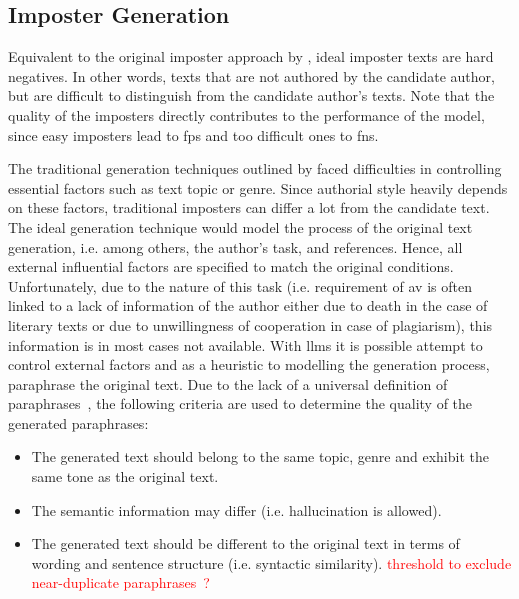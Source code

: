 \subsection{Imposter Generation}
\label{subsec:imposter_generation}

Equivalent to the original imposter approach by \citet{koppel_determining_2014}, ideal imposter texts are hard negatives.
In other words, texts that are not authored by the candidate author, but are difficult to distinguish from the candidate author's texts.
Note that the quality of the imposters directly contributes to the performance of the model, 
since easy imposters lead to \acp{fp} and too difficult ones to \acp{fn}.

The traditional generation techniques outlined by \citet{koppel_determining_2014} faced difficulties in controlling essential factors such as text topic or genre.
Since authorial style heavily depends on these factors, traditional imposters can differ a lot from the candidate text.
The ideal generation technique would model the process of the original text generation, 
i.e. among others, the author's task, and references.
Hence, all external influential factors are specified to match the original conditions.
Unfortunately, due to the nature of this task 
(i.e. requirement of \ac{av} is often linked to a lack of information of the author either due to death in the case of literary texts or 
due to unwillingness of cooperation in case of plagiarism), this information is in most cases not available.
With \acp{llm} it is possible attempt to control external factors and 
as a heuristic to modelling the generation process, paraphrase the original text.
Due to the lack of a universal definition of paraphrases~\cite{gohsen_task_oriented_2024}, the following criteria are used to determine the quality of the generated paraphrases:
\begin{itemize}
    \item The generated text should belong to the same topic, genre and exhibit the same tone as the original text.
    \item The semantic information may differ (i.e. hallucination is allowed).
    \item The generated text should be different to the original text in terms of wording and sentence structure (i.e. syntactic similarity). \textcolor{red}{threshold to exclude near-duplicate paraphrases~\cite{gohsen_captions_2023}?}
\end{itemize}

